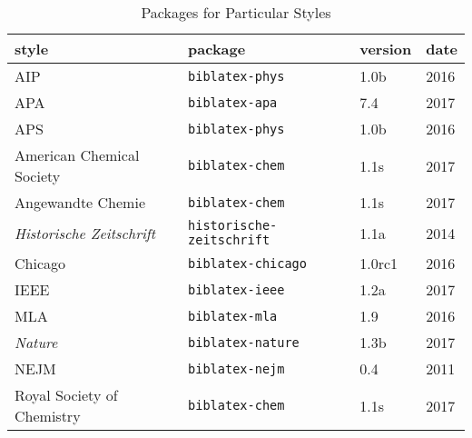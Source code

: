 %
%
%
%
%
%
%
%
%
%
%
%
\begin{table}
\caption{Packages for Particular Styles\label{ctan:bespoke}}
\small
\begin{tabular}{llll}
\toprule
\textsf{style}                            & \textsf{package}                 & \textsf{version} & \textsf{date} \\
\midrule AIP                     & \texttt{biblatex-phys}           & 1.0b             & 2016          \\
APA                              & \texttt{biblatex-apa}            & 7.4              & 2017          \\
APS                              & \texttt{biblatex-phys}           & 1.0b             & 2016          \\
American Chemical Society        & \texttt{biblatex-chem}           & 1.1s             & 2017          \\
Angewandte Chemie                & \texttt{biblatex-chem}           & 1.1s             & 2017          \\
\textit{Historische Zeitschrift} & \texttt{historische-zeitschrift} & 1.1a             & 2014          \\
Chicago                          & \texttt{biblatex-chicago}        & 1.0rc1           & 2016          \\
IEEE                             & \texttt{biblatex-ieee}           & 1.2a             & 2017          \\
MLA                              & \texttt{biblatex-mla}            & 1.9              & 2016          \\
\textit{Nature}                  & \texttt{biblatex-nature}         & 1.3b             & 2017          \\
NEJM                             & \texttt{biblatex-nejm}           & 0.4              & 2011          \\
Royal Society of Chemistry       & \texttt{biblatex-chem}           & 1.1s             & 2017          \\

\end{tabular}
\end{table}
